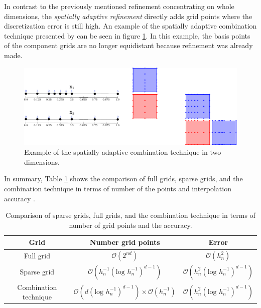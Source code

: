 In contrast to the previously mentioned refinement concentrating on whole dimensions, the \textit{spatially adaptive refinement} directly adds grid points where the discretization error is still high. An example of the spatially adaptive combination technique presented by \cite{obersteiner2021generalized} can be seen in figure \ref{fig:spatially_adaptive_combi_technique}. In this example, the basis points of the component grids are no longer equidistant because refinement was already made. \newline 

\begin{figure}[H]
	\centering
	\includegraphics[width=\textwidth]{figures/Fig_2_11_adaptive_combigrid}
	\caption{ Example of the spatially adaptive combination technique in two dimensions. } %
	\label{fig:spatially_adaptive_combi_technique}
\end{figure}


In summary, Table \ref{tab:comparison_grids} shows the comparison of full grids, sparse grids, and the combination technique in terms of number of the points and interpolation accuracy \cite{pfluger2010spatially}.


\begin{table}[H]
	\caption{ Comparison of sparse grids, full grids, and the combination technique in terms of number of grid points and the accuracy. }
	\label{tab:comparison_grids}
	\centering
	\begin{tabular}{|c c c|} 
		\hline
		Grid & Number grid points & Error \\
		\hline
		Full grid & $ \mathcal{O}\left(2^{nd}\right) $ & $ \mathcal{O}\left(h_n^2\right) $  \\
		Sparse grid & $ \mathcal{O}\left(h_n^{-1}\left(\text{log } h_n^{-1}\right)^{d-1}\right) $ & $ \mathcal{O}\left(h_n^{2}\left(\text{log } h_n^{-1}\right)^{d-1}\right) $ \\
		Combination technique & $ \mathcal{O}\left(d\left(\text{log } h_n^{-1}\right)^{d-1}\right) \times  \mathcal{O}\left(h_n^{-1}\right) $ & $ \mathcal{O}\left(h_n^{2}\left(\text{log } h_n^{-1}\right)^{d-1}\right) $\\
		\hline
	\end{tabular}
\end{table}

